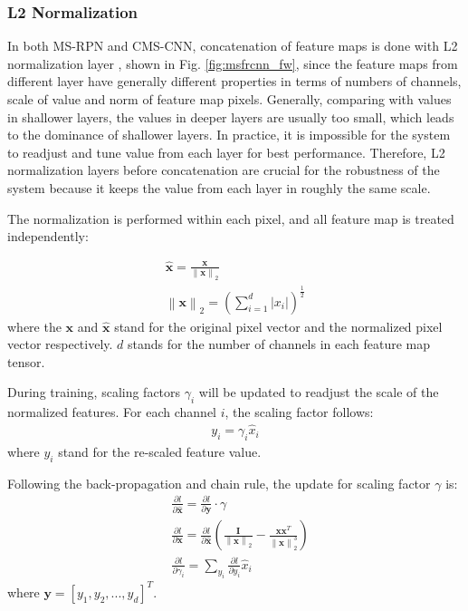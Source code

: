 \documentclass[10pt,journal,cspaper,compsoc]{IEEEtran}
\begin{document}
\subsubsection{L2 Normalization}
In both MS-RPN and CMS-CNN, concatenation of feature maps is done with L2 normalization layer \cite{liu2015parsenet}, shown in Fig. \ref{fig:msfrcnn_fw}, since the feature maps from different layer have generally different properties in terms of numbers of channels, scale of value and norm of feature map pixels. Generally, comparing with values in shallower layers, the values in deeper layers are usually too small, which leads to the dominance of shallower layers. In practice, it is impossible for the system to readjust and tune value from each layer for best performance. Therefore, L2 normalization layers before concatenation are crucial for the robustness of the system because it keeps the value from each layer in roughly the same scale. 

The normalization is performed within each pixel, and all feature map is treated independently:

\[
\begin{gathered}
\hat{\mathbf{x}} = \frac{\mathbf{x}}{\left \| \mathbf{x} \right \|_2} \\
\left \| \mathbf{x} \right \|_2 = ( \sum_{i=1}^{d}{\left | x_i \right |} ) ^ {\frac{1}{2}}
\end{gathered}
\]
where the $\mathbf{x}$ and $\hat{\mathbf{x}}$ stand for the original pixel vector and the normalized pixel vector respectively. $d$ stands for the number of channels in each feature map tensor. 

During training, scaling factors $\gamma_i$ will be updated to readjust the scale of the normalized features. For each channel $i$, the scaling factor follows: 
\[
\begin{gathered}
y_i=\gamma_i \hat{{x}}_i
\end{gathered}
\]
where $y_i$ stand for the re-scaled feature value. 

Following the back-propagation and chain rule, the update for scaling factor $\gamma$ is:
\[
\begin{split}
& \frac{\partial l}{\partial \hat{\mathbf{x}}}=\frac{\partial l}{\partial \mathbf{y}}\cdot \gamma \\
& \frac{\partial l}{\partial \mathbf{x}}=\frac{\partial l}{\partial \hat{\mathbf{x}}}\left ( \frac{\mathbf{I}}{\left \| \mathbf{x} \right \|_2}-\frac{\mathbf{x}\mathbf{x}^T}{\left \| \mathbf{x} \right \|_2^3} \right ) \\
& \frac{\partial l}{\partial \gamma_i}=\sum_{y_i}{\frac{\partial l}{\partial y_i}\hat{x}_i}
\end{split}
\]
where $\mathbf{y}=\left[ y_1,y_2,...,y_d\right]^T$. 
\end{document}
